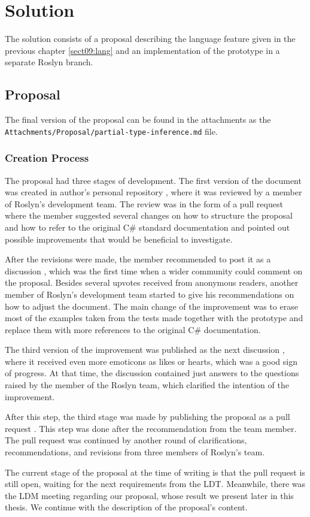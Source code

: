 \chapter{Solution}

The solution consists of a proposal describing the language feature given in the previous chapter \ref{sect09:lang} and an implementation of the prototype in a separate Roslyn branch.

\section{Proposal}

The final version of the proposal can be found in the attachments as the\\ \texttt{Attachments/Proposal/partial-type-inference.md} file.

\subsection{Creation Process}

The proposal had three stages of development.
The first version of the document was created in author's personal repository \cite{online:personalRepo}, where it was reviewed by a member of Roslyn's development team. 
The review was in the form of a pull request \cite{online:personalPull} where the member suggested several changes on how to structure the proposal and how to refer to the original C\# standard documentation and pointed out possible improvements that would be beneficial to investigate.
\par
After the revisions were made, the member recommended to post it as a discussion \cite{online:discussion1}, which was the first time when a wider community could comment on the proposal. 
Besides several upvotes received from anonymous readers, another member of Roslyn's development team started to give his recommendations on how to adjust the document. 
The main change of the improvement was to erase most of the examples taken from the tests made together with the prototype and replace them with more references to the original C\# documentation.
\par
The third version of the improvement was published as the next discussion \cite{online:discussion2}, where it received even more emoticons as likes or hearts, which was a good sign of progress. 
At that time, the discussion contained just answers to the questions raised by the member of the Roslyn team, which clarified the intention of the improvement.
\par
After this step, the third stage was made by publishing the proposal as a pull request \cite{online:pull2}. 
This step was done after the recommendation from the team member. 
The pull request was continued by another round of clarifications, recommendations, and revisions from three members of Roslyn's team.
\par
The current stage of the proposal at the time of writing is that the pull request is still open, waiting for the next requirements from the LDT.
Meanwhile, there was the LDM meeting regarding our proposal, whose result we present later in this thesis.
We continue with the description of the proposal's content.

